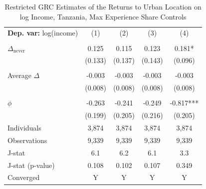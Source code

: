 \begin{table}[htbp] \centering \begin{threeparttable}
 \caption{Restricted GRC Estimates of the Returns to Urban Location on log Income, Tanzania, Max Experience Share Controls} 
 \label{tab:GRC_TZA_income_urban_unb_exp_m_sh} 
\begin{tabular}{l cccc} \toprule  \textbf{Dep. var:}  log(income) 
                    &\multicolumn{1}{c}{(1)}   &\multicolumn{1}{c}{(2)}   &\multicolumn{1}{c}{(3)}   &\multicolumn{1}{c}{(4)}   \\
                    &               &               &               &               \\
\addlinespace
$\Delta_{\text{never}}$&       0.125   &       0.115   &       0.123   &       0.181*  \\
                    &     (0.133)   &     (0.137)   &     (0.143)   &     (0.096)   \\
                    &               &               &               &               \\
\addlinespace
Average $\Delta$    &      -0.003   &      -0.003   &      -0.003   &      -0.003   \\
                    &     (0.008)   &     (0.008)   &     (0.008)   &     (0.008)   \\
                    &               &               &               &               \\
\addlinespace
$\phi$              &      -0.263   &      -0.241   &      -0.249   &      -0.817***\\
                    &     (0.199)   &     (0.205)   &     (0.216)   &     (0.205)   \\
\addlinespace
Individuals         &       3,874   &       3,874   &       3,874   &       3,874   \\
Observations        &       9,339   &       9,339   &       9,339   &       9,339   \\
J-stat              &         6.1   &         6.2   &         6.1   &         3.3   \\
J-stat (p-value)    &       0.108   &       0.102   &       0.107   &       0.349   \\
Converged           &           Y   &           Y   &           Y   &           Y   \\

\end{tabular}
\end{threeparttable}
\end{table}
